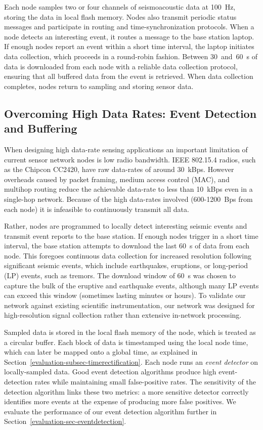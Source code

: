 Each node samples two or four channels of seismoacoustic data at 100~Hz,
storing the data in local flash memory. Nodes also transmit periodic status
messages and participate in routing and time-synchronization protocols. When
a node detects an interesting event, it routes a message to the base station
laptop. If enough nodes report an event within a short time interval, the
laptop initiates data collection, which proceeds in a round-robin fashion.
Between 30~and~60~s of data is downloaded from each node with a reliable data
collection protocol, ensuring that all buffered data from the event is
retrieved. When data collection completes, nodes return to sampling and
storing sensor data.

\subsection{Overcoming High Data Rates: Event Detection and Buffering}

When designing high data-rate sensing applications an important limitation of
current sensor network nodes is low radio bandwidth. IEEE 802.15.4 radios,
such as the Chipcon CC2420, have raw data-rates of around 30~kBps. However
overheads caused by packet framing, medium access control (MAC), and multihop
routing reduce the achievable data-rate to less than 10~kBps even in a
single-hop network. Because of the high data-rates involved (600-1200~Bps
from each node) it is infeasible to continuously transmit all data.

Rather, nodes are programmed to locally detect interesting seismic events and
transmit event reports to the base station. If enough nodes trigger in a
short time interval, the base station attempts to download the last 60~s of
data from each node. This foregoes continuous data collection for increased
resolution following significant seismic events, which include earthquakes,
eruptions, or long-period (LP) events, such as tremors. The download window
of 60~s was chosen to capture the bulk of the eruptive and earthquake events,
although many LP events can exceed this window (sometimes lasting minutes or
hours). To validate our network against existing scientific instrumentation,
our network was designed for high-resolution signal collection rather than
extensive in-network processing.

Sampled data is stored in the local flash memory of the node, which is
treated as a circular buffer. Each block of data is timestamped using the
local node time, which can later be mapped onto a global time, as explained
in Section~\ref{evaluation-subsec-timerectification}. Each node runs an
\textit{event detector} on locally-sampled data. Good event detection
algorithms produce high event-detection rates while maintaining small
false-positive rates. The sensitivity of the detection algorithm links these
two metrics: a more sensitive detector correctly identifies more events at
the expense of producing more false positives. We evaluate the performance of
our event detection algorithm further in
Section~\ref{evaluation-sec-eventdetection}.

